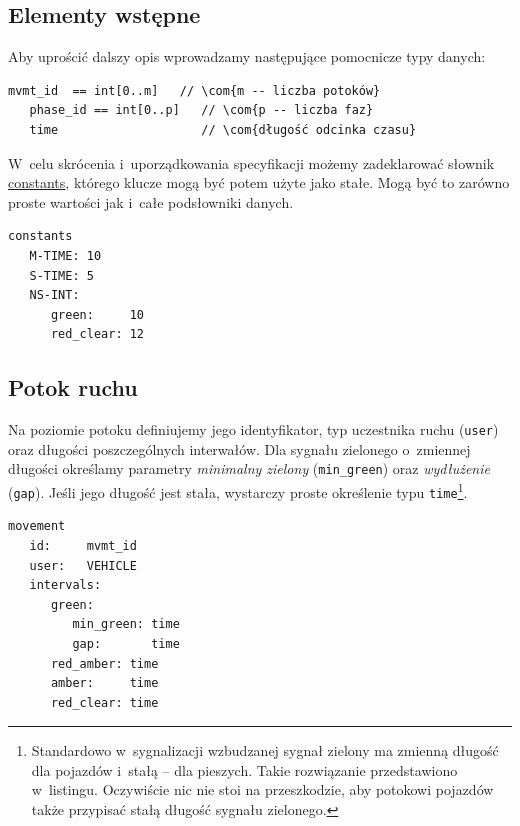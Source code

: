 \documentclass{pracamgr}
\theoremstyle{plain}
\newcommand{\com}[1]{\upshape\color{light-gray}{#1}}
\begin{document}
\subsection{Elementy wstępne}
Aby uprościć dalszy opis wprowadzamy następujące pomocnicze typy danych:
\begin{lstlisting}[caption=Pomocnicze typy danych.]
   mvmt_id  == int[0..m]   // \com{m -- liczba potoków}
   phase_id == int[0..p]   // \com{p -- liczba faz}
   time                    // \com{długość odcinka czasu}
\end{lstlisting}

W~celu skrócenia i~uporządkowania specyfikacji możemy zadeklarować słownik
\url{constants}, którego klucze mogą być potem użyte jako stałe. Mogą
być to zarówno proste wartości jak i~całe podsłowniki danych.

\noindent\begin{minipage}{1.0\linewidth}
\begin{lstlisting}[caption=Słownik stałych.]
constants
   M-TIME: 10
   S-TIME: 5
   NS-INT:
      green:     10
      red_clear: 12
\end{lstlisting}
\end{minipage}

\subsection{Potok ruchu}
Na poziomie potoku definiujemy jego identyfikator, typ uczestnika
ruchu (\texttt{user}) oraz długości poszczególnych interwałów.  Dla
sygnału zielonego o~zmiennej długości określamy parametry
\emph{minimalny zielony} (\texttt{min\_green}) oraz \emph{wydłużenie}
(\texttt{gap}). Jeśli jego długość jest stała, wystarczy proste
określenie typu \texttt{time}\footnote{Standardowo w~sygnalizacji
  wzbudzanej sygnał zielony ma zmienną długość dla pojazdów i~stałą --
dla pieszych. Takie rozwiązanie przedstawiono w~listingu. Oczywiście
nic nie stoi na przeszkodzie, aby potokowi pojazdów także przypisać
stałą długość sygnału zielonego.}.

\noindent\begin{minipage}{1.0\linewidth}
\begin{lstlisting}[caption=Schemat opisu potoku pojazdów.]
movement
   id:     mvmt_id
   user:   VEHICLE
   intervals:
      green:
         min_green: time
         gap:       time
      red_amber: time
      amber:     time
      red_clear: time
\end{lstlisting}
\end{minipage}
\end{document}
